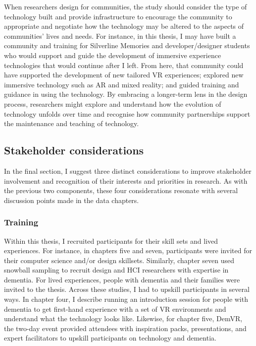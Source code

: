 When researchers design for communities, the study should consider the type of technology built and provide infrastructure to encourage the community to appropriate and negotiate how the technology may be altered to the aspects of communities’ lives and needs. For instance, in this thesis, I may have built a community and training for Silverline Memories and developer/designer students who would support and guide the development of immersive experience technologies that would continue after I left. From here, that community could have supported the development of new tailored VR experiences; explored new immersive technology such as AR and mixed reality; and guided training and guidance in using the technology. By embracing a longer-term lens in the design process, researchers might explore and understand how the evolution of technology unfolds over time and recognise how community partnerships support the maintenance and teaching of technology.

\subsection{Stakeholder considerations}
\label{StakeholderConsideration}
In the final section, I suggest three distinct considerations to improve stakeholder involvement and recognition of their interests and priorities in research. As with the previous two components, these four considerations resonate with several discussion points made in the data chapters.

\subsubsection{Training}
\label{Training}
Within this thesis, I recruited participants for their skill sets and lived experiences. For instance, in chapters five and seven, participants were invited for their computer science and/or design skillsets. Similarly, chapter seven used snowball sampling to recruit design and HCI researchers with expertise in dementia. For lived experiences, people with dementia and their families were invited to the thesis. Across these studies, I had to upskill participants in several ways. In chapter four, I describe running an introduction session for people with dementia to get first-hand experience with a set of VR environments and understand what the technology looks like. Likewise, for chapter five, DemVR, the two-day event provided attendees with inspiration packs, presentations, and expert facilitators to upskill participants on technology and dementia. 

